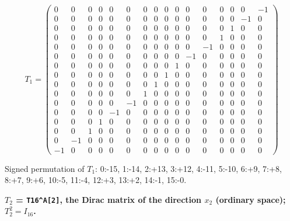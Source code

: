 \documentclass[
  10pt,
]{article}
\begin{document}
\[
T_1 = \scriptstyle \begin{pmatrix} 0 & 0 & 0 & 0 & 0 & 0 & 0 & 0 & 0 & 0 & 0 & 0 & 0 & 0 & 0 & -1 \\ 0 & 0 & 0 & 0 & 0 & 0 & 0 & 0 & 0 & 0 & 0 & 0 & 0 & 0 & -1 & 0 \\ 0 & 0 & 0 & 0 & 0 & 0 & 0 & 0 & 0 & 0 & 0 & 0 & 0 & 1 & 0 & 0 \\ 0 & 0 & 0 & 0 & 0 & 0 & 0 & 0 & 0 & 0 & 0 & 0 & 1 & 0 & 0 & 0 \\ 0 & 0 & 0 & 0 & 0 & 0 & 0 & 0 & 0 & 0 & 0 & -1 & 0 & 0 & 0 & 0 \\ 0 & 0 & 0 & 0 & 0 & 0 & 0 & 0 & 0 & 0 & -1 & 0 & 0 & 0 & 0 & 0 \\ 0 & 0 & 0 & 0 & 0 & 0 & 0 & 0 & 0 & 1 & 0 & 0 & 0 & 0 & 0 & 0 \\ 0 & 0 & 0 & 0 & 0 & 0 & 0 & 0 & 1 & 0 & 0 & 0 & 0 & 0 & 0 & 0 \\ 0 & 0 & 0 & 0 & 0 & 0 & 0 & 1 & 0 & 0 & 0 & 0 & 0 & 0 & 0 & 0 \\ 0 & 0 & 0 & 0 & 0 & 0 & 1 & 0 & 0 & 0 & 0 & 0 & 0 & 0 & 0 & 0 \\ 0 & 0 & 0 & 0 & 0 & -1 & 0 & 0 & 0 & 0 & 0 & 0 & 0 & 0 & 0 & 0 \\ 0 & 0 & 0 & 0 & -1 & 0 & 0 & 0 & 0 & 0 & 0 & 0 & 0 & 0 & 0 & 0 \\ 0 & 0 & 0 & 1 & 0 & 0 & 0 & 0 & 0 & 0 & 0 & 0 & 0 & 0 & 0 & 0 \\ 0 & 0 & 1 & 0 & 0 & 0 & 0 & 0 & 0 & 0 & 0 & 0 & 0 & 0 & 0 & 0 \\ 0 & -1 & 0 & 0 & 0 & 0 & 0 & 0 & 0 & 0 & 0 & 0 & 0 & 0 & 0 & 0 \\ -1 & 0 & 0 & 0 & 0 & 0 & 0 & 0 & 0 & 0 & 0 & 0 & 0 & 0 & 0 & 0 \end{pmatrix}
\]

Signed permutation of \(T_1\): 0:-15, 1:-14, 2:+13, 3:+12, 4:-11, 5:-10,
6:+9, 7:+8, 8:+7, 9:+6, 10:-5, 11:-4, 12:+3, 13:+2, 14:-1, 15:-0.

\textbf{\(T_2\) = \texttt{T16\^{}A{[}2{]}}, the Dirac matrix of the
direction \(x_2\) (ordinary space); \(T_2^2 = I_{16}\).}
\end{document}
